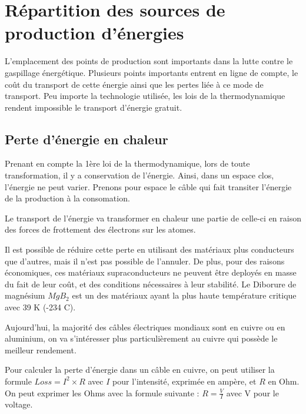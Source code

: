 \chapter{Répartition des sources de production d'énergies}

L'emplacement des points de production sont importants dans la lutte contre le gaspillage énergétique.
Plusieurs points importants entrent en ligne de compte, le coût du transport de cette énergie ainsi que les pertes liée à ce mode de transport.
Peu importe la technologie utilisée, les lois de la thermodynamique rendent impossible le transport d'énergie gratuit.

\section{Perte d'énergie en chaleur}

Prenant en compte la 1ère loi de la thermodynamique, lors de toute transformation, il y a
conservation de l'énergie.
Ainsi, dans un espace clos, l'énergie ne peut varier.
Prenons pour espace le câble qui fait transiter l'énergie de la production à la consomation.

Le transport de l'énergie va transformer en chaleur une partie de celle-ci en raison
des forces de frottement des électrons sur les atomes.

Il est possible de réduire cette perte en utilisant des matériaux plus conducteurs que
d'autres, mais il n'est pas possible de l'annuler.
De plus, pour des raisons économiques, ces matériaux supraconducteurs ne peuvent être
deployés en masse du fait de leur coût, et des conditions nécessaires à leur stabilité.
Le Diborure de magnésium $MgB_2$ est un des matériaux ayant la plus haute température
critique avec 39 K (-234 C).

Aujourd'hui, la majorité des câbles électriques mondiaux sont en cuivre ou en aluminium,
on va s'intéresser plus particulièrement au cuivre qui possède le meilleur rendement.

Pour calculer la perte d'énergie dans un câble en cuivre, on peut utiliser la formule $Loss = I^2\times R$ avec $I$ pour l'intensité, exprimée en ampère, et $R$ en Ohm.
On peut exprimer les Ohms avec la formule suivante : $R = \frac{V}{I}$ avec V pour le voltage.

